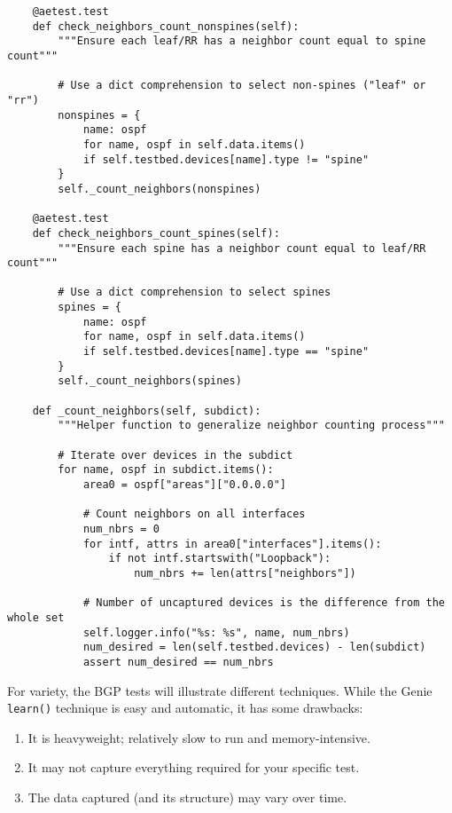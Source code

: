 \begin{verbatim}
    @aetest.test
    def check_neighbors_count_nonspines(self):
        """Ensure each leaf/RR has a neighbor count equal to spine count"""

        # Use a dict comprehension to select non-spines ("leaf" or "rr")
        nonspines = {
            name: ospf
            for name, ospf in self.data.items()
            if self.testbed.devices[name].type != "spine"
        }
        self._count_neighbors(nonspines)

    @aetest.test
    def check_neighbors_count_spines(self):
        """Ensure each spine has a neighbor count equal to leaf/RR count"""

        # Use a dict comprehension to select spines
        spines = {
            name: ospf
            for name, ospf in self.data.items()
            if self.testbed.devices[name].type == "spine"
        }
        self._count_neighbors(spines)

    def _count_neighbors(self, subdict):
        """Helper function to generalize neighbor counting process"""

        # Iterate over devices in the subdict
        for name, ospf in subdict.items():
            area0 = ospf["areas"]["0.0.0.0"]

            # Count neighbors on all interfaces
            num_nbrs = 0
            for intf, attrs in area0["interfaces"].items():
                if not intf.startswith("Loopback"):
                    num_nbrs += len(attrs["neighbors"])

            # Number of uncaptured devices is the difference from the whole set
            self.logger.info("%s: %s", name, num_nbrs)
            num_desired = len(self.testbed.devices) - len(subdict)
            assert num_desired == num_nbrs
\end{verbatim}

For variety, the BGP tests will illustrate different techniques. While the
Genie \verb|learn()| technique is easy and automatic, it has some drawbacks:

\begin{enumerate}
  \item It is heavyweight; relatively slow to run and memory-intensive.
  \item It may not capture everything required for your specific test.
  \item The data captured (and its structure) may vary over time.
\end{enumerate}

